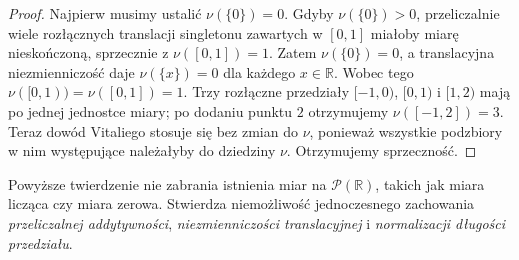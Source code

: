 \begin{proof}
Najpierw musimy ustalić $\nu(\{0\})=0$.
Gdyby $\nu(\{0\})>0$, przeliczalnie wiele
rozłącznych translacji singletonu zawartych w $[0,1]$
miałoby miarę nieskończoną, sprzecznie z
$\nu([0,1])=1$. Zatem $\nu(\{0\})=0$,
a translacyjna niezmienniczość daje
$\nu(\{x\})=0$ dla każdego $x\in\mathbb R$.
Wobec tego $\nu([0,1))=\nu([0,1])=1$.
Trzy rozłączne przedziały $[-1,0)$, $[0,1)$
i $[1,2)$ mają po jednej jednostce miary;
po dodaniu punktu $2$ otrzymujemy
$\nu([-1,2])=3$. Teraz dowód Vitaliego stosuje się
bez zmian do $\nu$, ponieważ wszystkie podzbiory
w nim występujące należałyby do dziedziny $\nu$.
Otrzymujemy sprzeczność.
\end{proof}

\begin{uwaga}
Powyższe twierdzenie nie zabrania istnienia miar na
$\mathcal P(\mathbb R)$, takich jak miara licząca
czy miara zerowa. Stwierdza niemożliwość jednoczesnego
zachowania \emph{przeliczalnej addytywności},
\emph{niezmienniczości translacyjnej} i
\emph{normalizacji długości przedziału}.
\end{uwaga}


